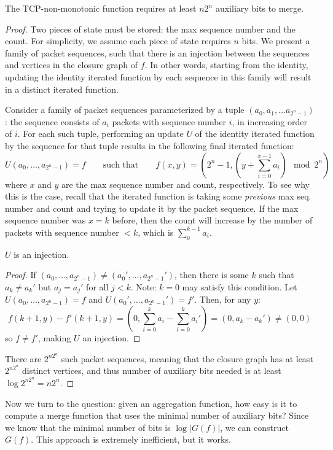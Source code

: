 \begin{theorem}
The TCP-non-monotonic function requires at least $n2^n$ auxiliary bits to merge.
\end{theorem}
\begin{proof}
Two pieces of state must be stored: the max sequence number and the count. For
simplicity, we assume each piece of state requires $n$ bits.
We present a family of packet sequences, such that there is an injection between the sequences and vertices in the closure graph of $f$. In other words, starting from the identity, updating the identity iterated function by each sequence in this family will result in a distinct iterated function. 

Consider a family of packet sequences parameterized by a tuple $(a_0, a_1, \ldots a_{2^n-1})$: the sequence consists of $a_i$ packets with sequence number $i$, in increasing order of $i$. For each such tuple, performing an update $U$ of the identity iterated function by the sequence for that tuple results in the following final iterated function:
\[ U(a_0, \ldots, a_{2^n-1}) = f\quad\quad \text{such that} \quad\quad f(x,y) = \left(2^n - 1, (y + \sum_{i=0}^{x-1} a_i) \mod 2^n\right) \]
where $x$ and $y$ are the max sequence number and count, respectively. To see why this is the case, recall that the iterated function is taking some \emph{previous} max seq. number and count and trying to update it by the packet sequence. If the max sequence number was $x = k$ before, then the count will increase by the number of packets with sequence number $< k$, which is $\sum_0^{k-1} a_i$.
\begin{lemma}
$U$ is an injection.
\end{lemma}
\begin{proof}
If $(a_0, \ldots, a_{2^n-1}) \neq (a_0', \ldots, a_{2^n-1}')$, then there is some $k$ such that $a_k \neq a_k'$ but $a_j = a_j'$ for all $j < k$. Note: $k= 0$ may satisfy this condition. Let $U(a_0, \ldots, a_{2^n-1}) = f$ and $U(a_0', \ldots, a_{2^n-1}') = f'$. Then, for any $y$:
\[ f(k+1, y) - f'(k+1,y) = \left(0, \sum_{i = 0}^k a_i - \sum_{i = 0}^k a_i'\right) = (0, a_k - a_k') \neq (0, 0) \]
so $f \neq f'$, making $U$ an injection.
\end{proof}
There are $2^{n2^n}$ such packet sequences, meaning that the closure graph has at least $2^{n2^n}$ distinct vertices, and thus number of auxiliary bits needed is at least $\log 2^{n2^n} = n2^n$. 
\end{proof}

Now we turn to the question: given an aggregation function, how easy is it to compute a merge function that uses the minimal number of auxiliary bits?
Since we know that the minimal number of bits is $\log |G(f)|$, we can construct $G(f)$. This approach is extremely inefficient, but it works. 

